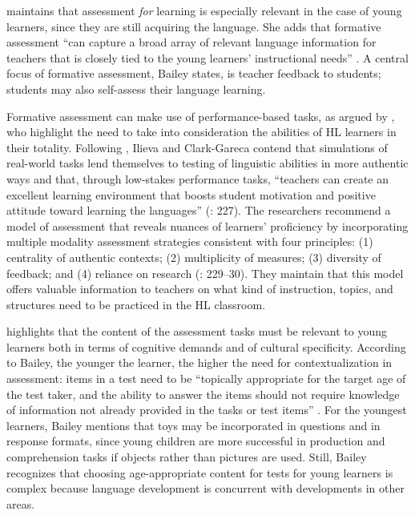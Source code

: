 \documentclass[output=paper]{langscibook}
\begin{document}
  \citet{Bailey2017} maintains that assessment \textit{for} learning is especially relevant in the case of young learners, since they are still acquiring the language. She adds that formative assessment “can capture a broad array of relevant language information for teachers that is closely tied to the young learners’ instructional needs” \citep[329]{Bailey2017}. A central focus of formative assessment, Bailey states, is teacher feedback to students; students may also self-assess their language learning.

Formative assessment can make use of performance-based tasks, as argued by \citet{IlievaClark-Gareca2016}, who highlight the need to take into consideration the abilities of HL learners in their totality. Following \citet{BrownAbeywickrama2010}, Ilieva and Clark-Gareca contend that simulations of real-world tasks lend themselves to testing of linguistic abilities in more authentic ways and that, through low-stakes performance tasks, “teachers can create an excellent learning environment that boosts student motivation and positive attitude toward learning the languages” (\citealt{IlievaClark-Gareca2016}: 227). The researchers recommend a model of assessment that reveals nuances of learners’ proficiency by incorporating multiple modality assessment strategies consistent with four principles: (1) centrality of authentic contexts; (2) multiplicity of measures; (3) diversity of feedback; and (4) reliance on research (\citealt{IlievaClark-Gareca2016}: 229--30). They maintain that this model offers valuable information to teachers on what kind of instruction, topics, and structures need to be practiced in the HL classroom.

\citet{Bailey2017} highlights that the content of the assessment tasks must be relevant to young learners both in terms of cognitive demands and of cultural specificity. According to Bailey, the younger the learner, the higher the need for contextualization in assessment: items in a test need to be “topically appropriate for the target age of the test taker, and the ability to answer the items should not require knowledge of information not already provided in the tasks or test items” \citep[332]{Bailey2017}. For the youngest learners, Bailey mentions that toys may be incorporated in questions and in response formats, since young children are more successful in production and comprehension tasks if objects rather than pictures are used. Still, Bailey recognizes that choosing age-appropriate content for tests for young learners is complex because language development is concurrent with developments in other areas.
\end{document}
